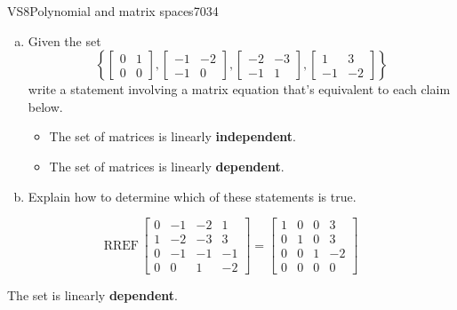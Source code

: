 \begin{exercise}{VS8}{Polynomial and matrix spaces}{7034} 
\begin{exerciseStatement} 

\begin{enumerate}[(a)]
\item  

 Given the set \[\left\{ \left[\begin{array}{cc}
0 & 1 \\
0 & 0
\end{array}\right] , \left[\begin{array}{cc}
-1 & -2 \\
-1 & 0
\end{array}\right] , \left[\begin{array}{cc}
-2 & -3 \\
-1 & 1
\end{array}\right] , \left[\begin{array}{cc}
1 & 3 \\
-1 & -2
\end{array}\right] \right\}\] write a statement involving a matrix equation that's equivalent to each claim below. 

 

\begin{itemize}
\item  

 The set of matrices is linearly \textbf{independent}. 

 
\item  

 The set of matrices is linearly \textbf{dependent}. 

 
\end{itemize}

     
\item  

 Explain how to determine which of these statements is true. 

 
\end{enumerate}

     \end{exerciseStatement}
 \begin{exerciseAnswer} 

 \[
\mathrm{RREF}\, \left[\begin{array}{cccc}
0 & -1 & -2 & 1 \\
1 & -2 & -3 & 3 \\
0 & -1 & -1 & -1 \\
0 & 0 & 1 & -2
\end{array}\right] = \left[\begin{array}{cccc}
1 & 0 & 0 & 3 \\
0 & 1 & 0 & 3 \\
0 & 0 & 1 & -2 \\
0 & 0 & 0 & 0
\end{array}\right]
            \] 

 

 The set is linearly \textbf{dependent}. 

 \end{exerciseAnswer}
 \end{exercise}


